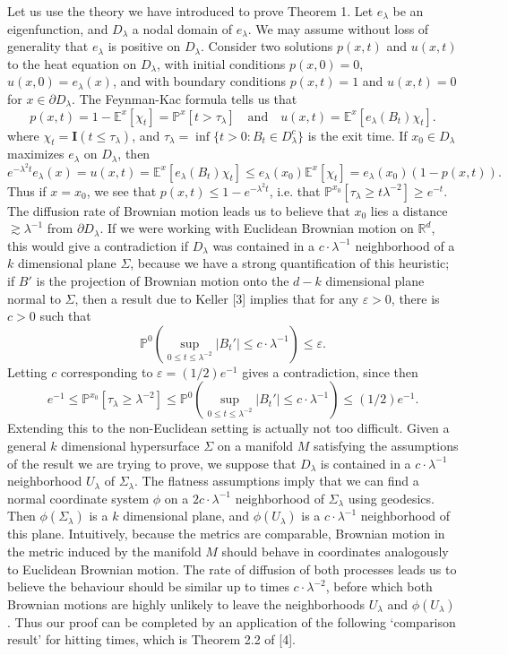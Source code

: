 \documentclass[12pt]{article}
\newcommand*{\R}{\mathbb{R}}
\begin{document}
Let us use the theory we have introduced to prove Theorem 1. Let $e_\lambda$ be an eigenfunction, and $D_\lambda$ a nodal domain of $e_\lambda$. We may assume without loss of generality that $e_\lambda$ is positive on $D_\lambda$. Consider two solutions $p(x,t)$ and $u(x,t)$ to the heat equation on $D_\lambda$, with initial conditions $p(x,0) = 0$, $u(x,0) = e_\lambda(x)$, and with boundary conditions $p(x,t) = 1$ and $u(x,t) = 0$ for $x \in \partial D_\lambda$. The Feynman-Kac formula tells us that
%
\[ p(x,t) = 1 - \mathbb{E}^x[\chi_t] = \mathbb{P}^x[t > \tau_\lambda] \quad\text{and}\quad u(x,t) = \mathbb{E}^x[ e_\lambda(B_t) \chi_t ]. \]
%
where $\chi_t = \mathbf{I}(t \leq \tau_\lambda)$, and $\tau_\lambda = \inf \{ t > 0 : B_t \in D_\lambda^c \}$ is the exit time. If $x_0 \in D_\lambda$ maximizes $e_\lambda$ on $D_\lambda$, then
%
\[ e^{- \lambda^2 t} e_\lambda(x) = u(x,t) = \mathbb{E}^x[ e_\lambda(B_t) \chi_t ] \leq e_\lambda(x_0) \mathbb{E}^x[\chi_t] = e_\lambda(x_0) (1 - p(x,t)). \]
%
Thus if $x = x_0$, we see that $p(x,t) \leq 1 - e^{-\lambda^2 t}$, i.e. that $\mathbb{P}^{x_0}[\tau_\lambda \geq t \lambda^{-2}] \geq e^{-t}$. The diffusion rate of Brownian motion leads us to believe that $x_0$ lies a distance $\gtrsim \lambda^{-1}$ from $\partial D_\lambda$. If we were working with Euclidean Brownian motion on $\R^d$, this would give a contradiction if $D_\lambda$ was contained in a $c \cdot \lambda^{-1}$ neighborhood of a $k$ dimensional plane $\Sigma$, because we have a strong quantification of this heuristic; if $B'$ is the projection of Brownian motion onto the $d-k$ dimensional plane normal to $\Sigma$, then a result due to Keller [3] implies that for any $\varepsilon > 0$, there is $c > 0$ such that
%
\[ \mathbb{P}^0 \left( \sup_{0 \leq t \leq \lambda^{-2}} |B_t'| \leq c \cdot \lambda^{-1} \right) \leq \varepsilon. \]
%
Letting $c$ corresponding to $\varepsilon = (1/2) e^{-1}$ gives a contradiction, since then
%
\[ e^{-1} \leq \mathbb{P}^{x_0}[\tau_\lambda \geq \lambda^{-2}] \leq \mathbb{P}^0 \left( \sup_{0 \leq t \leq \lambda^{-2}} |B_t'| \leq c \cdot \lambda^{-1} \right) \leq (1/2) e^{-1}. \]
%
Extending this to the non-Euclidean setting is actually not too difficult. Given a general $k$ dimensional hypersurface $\Sigma$ on a manifold $M$ satisfying the assumptions of the result we are trying to prove, we suppose that $D_\lambda$ is contained in a $c \cdot \lambda^{-1}$ neighborhood $U_\lambda$ of $\Sigma_\lambda$. The flatness assumptions imply that we can find a normal coordinate system $\phi$ on a $2c \cdot \lambda^{-1}$ neighborhood of $\Sigma_\lambda$ using geodesics. Then $\phi(\Sigma_\lambda)$ is a $k$ dimensional plane, and $\phi(U_\lambda)$ is a $c \cdot \lambda^{-1}$ neighborhood of this plane. Intuitively, because the metrics are comparable, Brownian motion in the metric induced by the manifold $M$ should behave in coordinates analogously to Euclidean Brownian motion. The rate of diffusion of both processes leads us to believe the behaviour should be similar up to times $c \cdot \lambda^{-2}$, before which both Brownian motions are highly unlikely to leave the neighborhoods $U_\lambda$ and $\phi(U_\lambda)$. Thus our proof can be completed by an application of the following `comparison result' for hitting times, which is Theorem 2.2 of [4].
\end{document}
